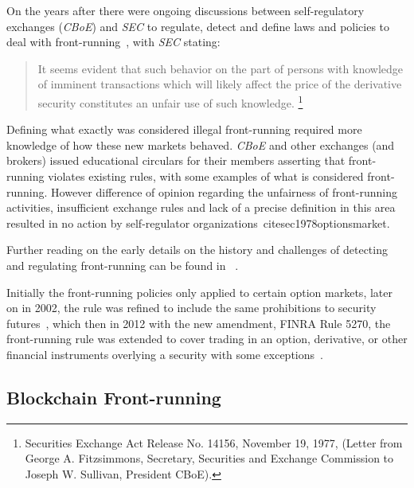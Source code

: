 
On the years after there were ongoing discussions between self-regulatory exchanges (\eg \textit{CBoE}) and  \textit{SEC} to regulate, detect and define laws and policies to deal with front-running~\cite{markham1988front}, with \textit{SEC} stating: 
\begin{quote}
It seems evident that such behavior on the part of persons with knowledge of imminent transactions which will likely affect the price of the derivative security constitutes an unfair use of such knowledge. \footnote{Securities Exchange Act Release No. 14156, November 19, 1977, (Letter from George A. Fitzsimmons, Secretary, Securities and Exchange Commission to Joseph W. Sullivan, President  CBoE).}
\end{quote} 

Defining what exactly was considered illegal front-running required more knowledge of how these new markets behaved. \textit{CBoE} and other exchanges (and brokers) issued educational circulars for their members asserting that front-running violates existing rules, with some examples of what is considered front-running. However difference of opinion regarding the unfairness of front-running activities, insufficient exchange rules and lack of a precise definition in this area resulted in no action by self-regulator organizations~cite{sec1978optionsmarket}. 

Further reading on the early details on the history and challenges of detecting and regulating front-running can be found in~\cite{markham1988front} . %

Initially the front-running policies only applied to certain option markets, later on in 2002, the rule was refined to include the same prohibitions to security futures~\cite{finra_2002}, which then in 2012 with the new amendment, FINRA Rule 5270, the front-running rule was extended to cover trading in an option, derivative, or other financial instruments overlying a security with some exceptions~\cite{sec2012frontrunning, finra_2012}.


\subsection{Blockchain Front-running} %
\label{sec:Front Running on the Blockchains}

